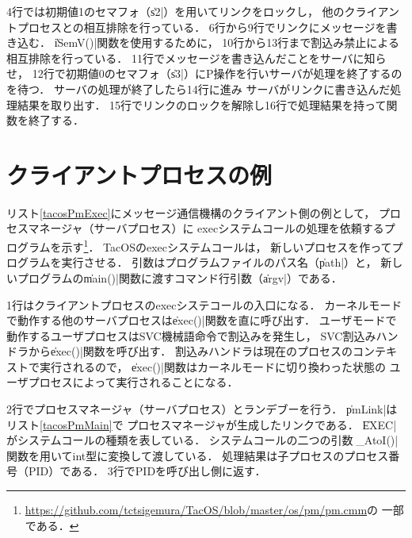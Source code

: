 

4行では初期値1のセマフォ（\|s2|）を用いてリンクをロックし，
他のクライアントプロセスとの相互排除を行っている．
6行から9行でリンクにメッセージを書き込む．
\|iSemV()|関数を使用するために，
10行から13行まで割込み禁止による相互排除を行っている．
11行でメッセージを書き込んだことをサーバに知らせ，
12行で初期値0のセマフォ（\|s3|）にP操作を行いサーバが処理を終了するのを待つ．
サーバの処理が終了したら14行に進み
サーバがリンクに書き込んだ処理結果を取り出す．
15行でリンクのロックを解除し16行で処理結果を持って関数を終了する．

\section{クライアントプロセスの例}
リスト\ref{tacosPmExec}にメッセージ通信機構のクライアント側の例として，
プロセスマネージャ（サーバプロセス）に
execシステムコールの処理を依頼するプログラムを示す\footnote{
  \url{https://github.com/tctsigemura/TacOS/blob/master/os/pm/pm.cmm}の
  一部である．}．
TacOSのexecシステムコールは，
新しいプロセスを作ってプログラムを実行させる．
引数はプログラムファイルのパス名（\|path|）と，
新しいプログラムの\|main()|関数に渡すコマンド行引数（\|argv|）である．



1行はクライアントプロセスのexecシステコールの入口になる．
カーネルモードで動作する他のサーバプロセスは\|exec()|関数を直に呼び出す．
ユーザモードで動作するユーザプロセスはSVC機械語命令で割込みを発生し，
SVC割込みハンドラから\|exec()|関数を呼び出す．
割込みハンドラは現在のプロセスのコンテキストで実行されるので，
\|exec()|関数はカーネルモードに切り換わった状態の
ユーザプロセスによって実行されることになる．

2行でプロセスマネージャ（サーバプロセス）とランデブーを行う．
\|pmLink|はリスト\ref{tacosPmMain}で
プロセスマネージャが生成したリンクである．
\|EXEC|がシステムコールの種類を表している．
システムコールの二つの引数は\|_AtoI()|関数を用いてint型に変換して渡している．
処理結果は子プロセスのプロセス番号（PID）である．
3行でPIDを呼び出し側に返す．

